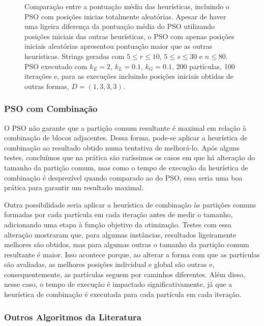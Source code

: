         \begin{figure}[htb]
            \centering

            \caption{Comparação entre a pontuação média das heurísticas, incluindo o PSO com posições inicias totalmente aleatórias. Apesar de haver uma ligeira diferença da pontuação média do PSO utilizando posições iniciais das outras heurísticas, o PSO com apenas posições iniciais aleatórias apresentou pontuação maior que as outras heurísticas. Strings geradas com $5 \leq r \leq 10$, $5 \leq s \leq 30$ e $n \leq 80$. PSO executado com $k_E = 2$, $k_L = 0.1$, $k_G = 0.1$, 200 partículas, 100 iterações e, para as execuções incluindo posições iniciais obtidas de outras formas, $D = (1, 3, 3, 3)$.}
            \label{fig:pso-puro}
        \end{figure}

    \subsubsection{PSO com Combinação}

        O PSO não garante que a partição comum resultante é maximal em relação à combinação de blocos adjacentes. Dessa forma, pode-se aplicar a heurística de combinação ao resultado obtido numa tentativa de melhorá-lo. Após alguns testes, concluímos que na prática são raríssimos os casos em que há alteração do tamanho da partição comum, mas como o tempo de execução da heurística de combinação é desprezível quando comparado ao do PSO, essa seria uma boa prática para garantir um resultado maximal.

        Outra possibilidade seria aplicar a heurística de combinação às partições comuns formadas por cada partícula em cada iteração antes de medir o tamanho, adicionando uma etapa à função objetivo da otimização. Testes com essa alteração mostraram que, para algumas instâncias, resultados ligeiramente melhores são obtidos, mas para algumas outras o tamanho da partição comum resultante é maior. Isso acontece porque, ao alterar a forma com que as partículas são avaliadas, as melhores posições individual e global são outras e, consequentemente, as partículas seguem por caminhos diferentes. Além disso, nesse caso, o tempo de execução é impactado significativamente, já que a heurística de combinação é executada para cada partícula em cada iteração.

    \subsubsection{Outros Algoritmos da Literatura}

